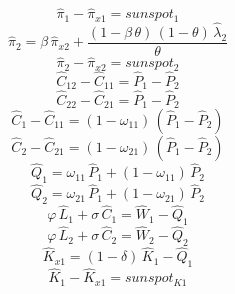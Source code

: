\begin{dmath}
{{\hat{\pi}_{1}}}-{{\hat{\pi}_{x1}}}={{sunspot_{1}}}
\end{dmath}
\begin{dmath}
{{\hat{\pi}_{2}}}={{\beta}}\, {{\hat{\pi}_{x2}}}+\frac{\left(1-{{\beta}}\, {{\theta}}\right)\, \left(1-{{\theta}}\right)\, {{\hat{\lambda}_{2}}}}{{{\theta}}}
\end{dmath}
\begin{dmath}
{{\hat{\pi}_{2}}}-{{\hat{\pi}_{x2}}}={{sunspot_{2}}}
\end{dmath}
\begin{dmath}
{{\hat{C}_{12}}}-{{\hat{C}_{11}}}={{\hat{P}_{1}}}-{{\hat{P}_{2}}}
\end{dmath}
\begin{dmath}
{{\hat{C}_{22}}}-{{\hat{C}_{21}}}={{\hat{P}_{1}}}-{{\hat{P}_{2}}}
\end{dmath}
\begin{dmath}
{{\hat{C}_{1}}}-{{\hat{C}_{11}}}=\left(1-{{\omega_{11}}}\right)\, \left({{\hat{P}_{1}}}-{{\hat{P}_{2}}}\right)
\end{dmath}
\begin{dmath}
{{\hat{C}_{2}}}-{{\hat{C}_{21}}}=\left(1-{{\omega_{21}}}\right)\, \left({{\hat{P}_{1}}}-{{\hat{P}_{2}}}\right)
\end{dmath}
\begin{dmath}
{{\hat{Q}_{1}}}={{\omega_{11}}}\, {{\hat{P}_{1}}}+\left(1-{{\omega_{11}}}\right)\, {{\hat{P}_{2}}}
\end{dmath}
\begin{dmath}
{{\hat{Q}_{2}}}={{\omega_{21}}}\, {{\hat{P}_{1}}}+\left(1-{{\omega_{21}}}\right)\, {{\hat{P}_{2}}}
\end{dmath}
\begin{dmath}
{{\varphi}}\, {{\hat{L}_{1}}}+{{\sigma}}\, {{\hat{C}_{1}}}={{\hat{W}_{1}}}-{{\hat{Q}_{1}}}
\end{dmath}
\begin{dmath}
{{\varphi}}\, {{\hat{L}_{2}}}+{{\sigma}}\, {{\hat{C}_{2}}}={{\hat{W}_{2}}}-{{\hat{Q}_{2}}}
\end{dmath}
\begin{dmath}
{{\hat{K}_{x1}}}=\left(1-{{\delta}}\right)\, {{\hat{K}_{1}}}-{{\hat{Q}_{1}}}
\end{dmath}
\begin{dmath}
{{\hat{K}_{1}}}-{{\hat{K}_{x1}}}={{sunspot_{K1}}}
\end{dmath}
